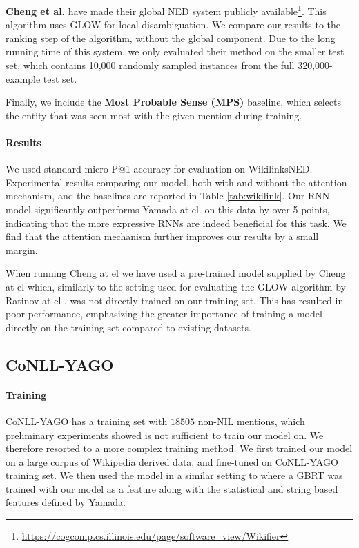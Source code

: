 \documentclass[11pt]{article}
\begin{document}
	\textbf{Cheng et al.}  have made their global NED system publicly available\footnote{\url{https://cogcomp.cs.illinois.edu/page/software\_view/Wikifier}}. This algorithm uses GLOW \cite{Ratinov2011} for local disambiguation. We compare our results to the ranking step of the algorithm, without the global component. Due to the long running time of this system, we only evaluated their method on the smaller test set, which contains 10,000 randomly sampled instances from the full 320,000-example test set.
	
	Finally, we include the \textbf{Most Probable Sense (MPS)} baseline, which selects the entity that was seen most with the given mention during training.
	
	\paragraph{Results}
	We used standard micro P@1 accuracy for evaluation on WikilinksNED. Experimental results comparing our model, both with and without the attention mechanism, and the baselines are reported in Table \ref{tab:wikilink}. Our RNN model significantly outperforms Yamada at el. on this data by over 5 points, indicating that the more expressive RNNs are indeed beneficial for this task. We find that the attention mechanism further improves our results by a small margin.
	
	When running Cheng at el  we have used a pre-trained model supplied by Cheng at el which, similarly to the setting used for evaluating the GLOW algorithm by Ratinov at el \cite{ratinov2011glow}, was not directly trained on our training set. This has resulted in poor performance, emphasizing the greater importance of training a model directly on the training set compared to existing datasets.
	
	\subsection{CoNLL-YAGO}
	\label{experiments-conll}
	
	\paragraph{Training}
	CoNLL-YAGO has a training set with $18505$ non-NIL mentions, which preliminary experiments showed is not sufficient to train our model on. We therefore resorted to a more complex training method. We first trained our model on a large corpus of Wikipedia derived data, and fine-tuned on CoNLL-YAGO training set. We then used the model in a similar setting to  where a GBRT was trained with our model as a feature along with the statistical and string based features defined by Yamada. 
	
\end{document}
